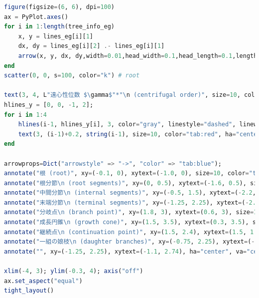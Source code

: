 \begin{lstlisting}[language=julia]
figure(figsize=(6, 6), dpi=100)
ax = PyPlot.axes()
for i in 1:length(tree_info_eg)
    x, y = lines_eg[i][1]
    dx, dy = lines_eg[i][2] .- lines_eg[i][1]
    arrow(x, y, dx, dy,width=0.01,head_width=0.1,head_length=0.1,length_includes_head=true,color="k")
end
scatter(0, 0, s=100, color="k") # root

text(3, 4, L"遠心性位数 $\gamma$"*"\n (centrifugal order)", size=10, color="tab:red", ha="center", va="center")
hlines_y = [0, 0, -1, 2];
for i in 1:4
    hlines(i-1, hlines_y[i], 3, color="gray", linestyle="dashed", linewidth=2, alpha=0.5)
    text(3, (i-1)+0.2, string(i-1), size=10, color="tab:red", ha="center", va="center")
end

arrowprops=Dict("arrowstyle" => "->", "color" => "tab:blue");
annotate("根 (root)", xy=(-0.1, 0), xytext=(-1.0, 0), size=10, color="tab:blue", ha="center", va="center", arrowprops=arrowprops)
annotate("根分節\n (root segments)", xy=(0, 0.5), xytext=(-1.6, 0.5), size=10, color="tab:blue", ha="center", va="center", arrowprops=arrowprops)
annotate("中間分節\n (internal segments)", xy=(-0.5, 1.5), xytext=(-2.2, 1.5), size=10, color="tab:blue", ha="center", va="center", arrowprops=arrowprops)
annotate("末端分節\n (terminal segments)", xy=(-1.25, 2.25), xytext=(-2.8, 2.25), size=10, color="tab:blue", ha="center", va="center", arrowprops=arrowprops)
annotate("分岐点\n (branch point)", xy=(1.8, 3), xytext=(0.6, 3), size=10, color="tab:blue", ha="center", va="center", arrowprops=arrowprops)
annotate("成長円錐\n (growth cone)", xy=(1.5, 3.5), xytext=(0.3, 3.5), size=10, color="tab:blue", ha="center", va="center", arrowprops=arrowprops)
annotate("継続点\n (continuation point)", xy=(1.5, 2.4), xytext=(1.5, 1.5), size=10, color="tab:blue", ha="center", va="center", arrowprops=arrowprops)
annotate("一組の娘枝\n (daughter branches)", xy=(-0.75, 2.25), xytext=(-1.25, 3), size=10, color="tab:purple", ha="center", va="center", arrowprops=Dict("arrowstyle" => "->", "color" => "tab:purple"))
annotate("", xy=(-1.25, 2.25), xytext=(-1.1, 2.74), ha="center", va="center", arrowprops=Dict("arrowstyle" => "->", "color" => "tab:purple"))

xlim(-4, 3); ylim(-0.3, 4); axis("off")
ax.set_aspect("equal")
tight_layout()
\end{lstlisting}
